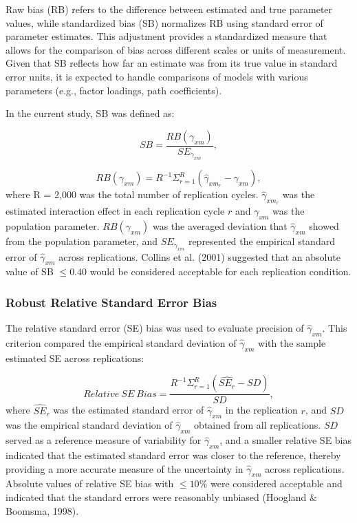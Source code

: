 \documentclass[
  man]{apa6}
\begin{document}
Raw bias (RB) refers to the difference between estimated and true parameter values, while standardized bias (SB) normalizes RB using standard error of parameter estimates. This adjustment provides a standardized measure that allows for the comparison of bias across different scales or units of measurement. Given that SB reflects how far an estimate was from its true value in standard error units, it is expected to handle comparisons of models with various parameters (e.g., factor loadings, path coefficients).

In the current study, SB was defined as:

\begin{equation}
SB = \frac{RB(\gamma_{xm})}{SE_{\gamma_{xm}}},
\end{equation}

\begin{equation}
RB(\gamma_{xm}) = R^{-1}\Sigma^{R}_{r = 1}(\hat{\gamma}_{xm_{r}} - \gamma_{xm}),
\end{equation}
where R = 2,000 was the total number of replication cycles. \(\hat{\gamma}_{xm_{r}}\) was the estimated interaction effect in each replication cycle \(r\) and \(\gamma_{xm}\) was the population parameter. \(RB(\gamma_{xm})\) was the averaged deviation that \(\hat{\gamma}_{xm}\) showed from the population parameter, and \(SE_{\gamma_{xm}}\) represented the empirical standard error of \(\hat{\gamma}_{xm}\) across replications. Collins et al. (2001) suggested that an absolute value of SB \(\le 0.40\) would be considered acceptable for each replication condition.

\subsubsection{Robust Relative Standard Error Bias}\label{robust-relative-standard-error-bias}

The relative standard error (SE) bias was used to evaluate precision of \(\hat{\gamma}_{xm}\). This criterion compared the empirical standard deviation of \(\hat{\gamma}_{xm}\) with the sample estimated SE across replications:

\begin{equation}
Relative\ SE\ Bias = \frac{R^{-1}\Sigma^{R}_{r = 1}(\widehat{SE_{r}} - SD)}{SD},
\end{equation}
where \(\widehat{SE}_{r}\) was the estimated standard error of \(\hat{\gamma}_{xm}\) in the replication \(r\), and \(SD\) was the empirical standard deviation of \(\hat{\gamma}_{xm}\) obtained from all replications. \(SD\) served as a reference measure of variability for \(\hat{\gamma}_{xm}\), and a smaller relative SE bias indicated that the estimated standard error was closer to the reference, thereby providing a more accurate measure of the uncertainty in \(\hat{\gamma}_{xm}\) across replications. Absolute values of relative SE bias with \(\le 10\%\) were considered acceptable and indicated that the standard errors were reasonably unbiased (Hoogland \(\&\) Boomsma, 1998).
\end{document}
